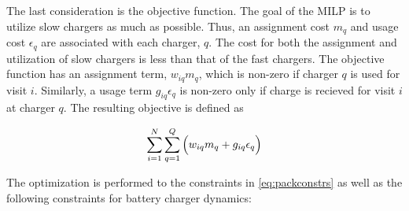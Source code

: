 \documentclass[letterpaper, 10pt, conference]{IEEEtran}
\begin{document}
The last consideration is the objective function. The goal of the MILP is to utilize slow chargers as much as possible. Thus, an assignment cost $m_q$ and usage cost $\epsilon_q$ are associated with each charger, $q$. The cost for both the assignment and utilization of slow chargers is less than that of the fast chargers. The objective function has an assignment term, $w_{iq}m_q$, which is non-zero if charger $q$ is used for visit $i$. Similarly, a usage term $g_{iq} \epsilon_q$ is non-zero only if charge is recieved for visit $i$ at charger $q$. The resulting objective is defined as

\begin{equation}
\label{eq:objective}
	\sum_{i=1}^N \sum_{q=1}^Q \Big( w_{iq} m_q + g_{iq} \epsilon_q \Big) \\
\end{equation}

\noindent
The optimization is performed to the constraints in \eqref{eq:packconstrs} as well as the following constraints for battery charger dynamics:
\end{document}
